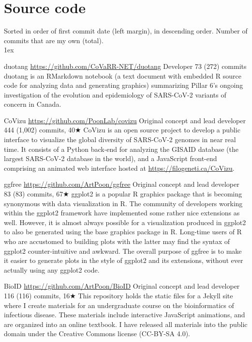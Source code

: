 
\section{Source code}

Sorted in order of first commit date (left margin), in descending order.
Number of commits that are my own (total).\\

\parskip 1ex

{duotang}
{\url{https://github.com/CoVaRR-NET/duotang}}
{Developer}
{73 (272) commits}
{duotang is an RMarkdown notebook (a text document with embedded R source code for analyzing data and generating graphics) summarizing Pillar 6's ongoing investigation of the evolution and epidemiology of SARS-CoV-2 variants of concern in Canada.}

{CoVizu}
{\url{https://github.com/PoonLab/covizu}}
{Original concept and lead developer}
{444 (1,002) commits, 40$\bigstar$}
{CoVizu is an open source project to develop a public interface to visualize the global diversity of SARS-CoV-2 genomes in near real time.
It consists of a Python back-end for analyzing the GISAID database (the largest SARS-CoV-2 database in the world), and a JavaScript front-end comprising an animated web interface hosted at \url{https://filogeneti.ca/CoVizu}.}


{ggfree}
{\url{https://github.com/ArtPoon/ggfree}}
{Original concept and lead developer}
{83 (83) commits, 67$\bigstar$}
{ggplot2 is a popular R graphics package that is becoming synonymous with data visualization in R. The community of developers working within the ggplot2 framework have implemented some rather nice extensions as well. However, it is almost always possible for a visualization produced in ggplot2 to also be generated using the base graphics package in R. Long-time users of R who are accustomed to building plots with the latter may find the syntax of ggplot2 counter-intuitive and awkward. The overall purpose of ggfree is to make it easier to generate plots in the style of ggplot2 and its extensions, without ever actually using any ggplot2 code.}

{BioID}
{\url{https://github.com/ArtPoon/BioID}}
{Original concept and lead developer}
{116 (116) commits, 16$\bigstar$}
{This repository holds the static files for a Jekyll site where I create materials for an undergraduate course on the bioinformatics of infectious disease.  These materials include interactive JavaScript animations, and are organized into an online textbook.  I have released all materials into the public domain under the Creative Commons license (CC-BY-SA 4.0).}



